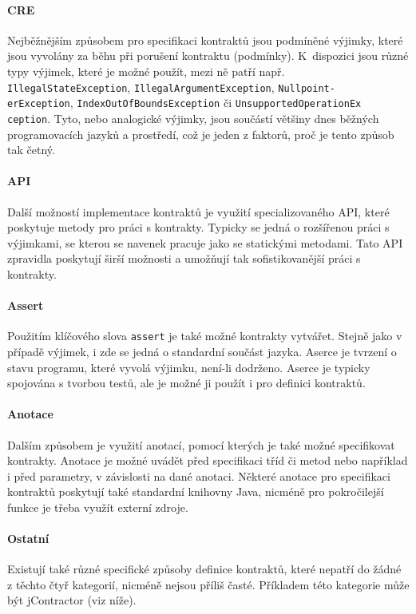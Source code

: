 		\paragraph{CRE}
		 Nejběžnějším způsobem pro specifikaci kontraktů jsou podmíněné výjimky, které jsou vyvolány za běhu při porušení kontraktu (podmínky). K~dispozici jsou různé typy výjimek, které je možné použít, mezi ně patří např. \texttt{IllegalStateException}, \texttt{IllegalArgumentException}, \texttt{Nullpoint-}\\\texttt{erException}, \texttt{IndexOutOfBoundsException} či \texttt{UnsupportedOperationEx}\\\texttt{ception}. Tyto, nebo analogické výjimky, jsou součástí většiny dnes běžných programovacích jazyků a prostředí, což je jeden z faktorů, proč je tento způsob tak četný.
				
		\paragraph{API}
		Další možností implementace kontraktů je využití specializovaného API, které poskytuje metody pro práci s kontrakty. Typicky se jedná o rozšířenou práci s výjimkami, se kterou se navenek pracuje jako se statickými metodami. Tato API zpravidla poskytují širší možnosti a umožňují tak sofistikovanější práci s kontrakty.
		
		\paragraph{Assert}
		Použitím klíčového slova \texttt{assert} je také možné kontrakty vytvářet. Stejně jako v případě výjimek, i zde se jedná o standardní součást jazyka. Aserce je tvrzení o stavu programu, které vyvolá výjimku, není-li dodrženo. Aserce je typicky spojována s tvorbou testů, ale je možné ji použít i pro definici kontraktů.
		
		\paragraph{Anotace}
		Dalším způsobem je využití anotací, pomocí kterých je také možné specifikovat kontrakty. Anotace je možné uvádět před specifikaci tříd či metod nebo například i před parametry, v závislosti na dané anotaci. Některé anotace pro specifikaci kontraktů poskytují také standardní knihovny Java, nicméně pro pokročilejší funkce je třeba využít externí zdroje.
		
		\paragraph{Ostatní}
		Existují také různé specifické způsoby definice kontraktů, které nepatří do žádné z těchto čtyř kategorií, nicméně nejsou příliš časté. Příkladem této kategorie může být jContractor (viz níže).
	


